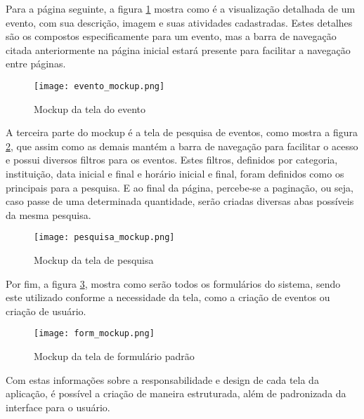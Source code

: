 Para a página seguinte, a figura \ref{evento_mockup} mostra como é a visualização detalhada de um evento, com sua descrição, imagem e suas atividades cadastradas. Estes detalhes são os compostos especificamente para um evento, mas a barra de navegação citada anteriormente na página inicial estará presente para facilitar a navegação entre páginas.
\begin{figure}[h]
    \caption{\label{evento_mockup}Mockup da tela do evento}
    \vspace{5pt}
    \centering
    \texttt{[image: evento\_mockup.png]}
    \vspace{5pt}
\end{figure}

A terceira parte do mockup é a tela de pesquisa de eventos, como mostra a figura \ref{pesquisa_mockup}, que assim como as demais mantém a barra de navegação para facilitar o acesso e possui diversos filtros para os eventos. Estes filtros, definidos por categoria, instituição, data inicial e final e horário inicial e final, foram definidos como os principais para a pesquisa. E ao final da página, percebe-se a paginação, ou seja, caso passe de uma determinada quantidade, serão criadas diversas abas possíveis da mesma pesquisa.
\begin{figure}[H]
    \caption{\label{pesquisa_mockup}Mockup da tela de pesquisa}
    \vspace{5pt}
    \centering
    \texttt{[image: pesquisa\_mockup.png]}
    \vspace{5pt}
\end{figure}

Por fim, a figura \ref{form_mockup}, mostra como serão todos os formulários do sistema, sendo este utilizado conforme a necessidade da tela, como a criação de eventos ou criação de usuário. 
\begin{figure}[H]
    \caption{\label{form_mockup}Mockup da tela de formulário padrão}
    \vspace{5pt}
    \centering
    \texttt{[image: form\_mockup.png]}
    \vspace{5pt}
\end{figure}

Com estas informações sobre a responsabilidade e design de cada tela da aplicação, é possível a criação de maneira estruturada, além de padronizada da interface para o usuário. 

